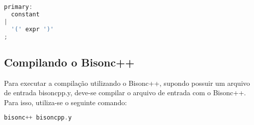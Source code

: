 \begin{apendicesenv}
\begin{lstlisting}[language=c,  caption=Exemplo de regra gramatical utilizando recursividade]
primary:
  constant
|
  '(' expr ')'
;
\end{lstlisting}

\subsection{Compilando o Bisonc++}
Para executar a compilação utilizando o Bisonc++, supondo possuir um arquivo de entrada bisoncpp.y, deve-se compilar o arquivo de entrada com o Bisonc++. Para isso, utiliza-se o seguinte comando:
\begin{lstlisting}[language=c,  caption=Comando para compilação do bisonc++]
bisonc++ bisoncpp.y
\end{lstlisting}


\end{apendicesenv}
